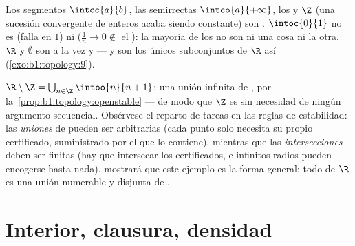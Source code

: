 \begin{example}\label{ex:b1:topology:closed}
Los segmentos $\intcc{a}{b}$, las semirrectas $\intco{a}{+\infty}$,
los  y $\Z$ (una sucesión convergente de enteros
acaba siendo constante) son . $\intoc{0}{1}$ no es 
(falla en $1$) ni  ($\frac 1n \to 0 \notin$ el ): la
mayoría de los  no son ni una cosa ni la otra. $\R$ y
$\emptyset$ son a la vez  y  --- y son los únicos
subconjuntos de $\R$ así (\cref{exo:b1:topology:9}).
\end{example}

\begin{example}\label{ex:b1:topology:rminusz}
$\R \setminus \Z = \bigcup_{n \in \Z} \intoo{n}{n+1}$: una unión
infinita de  ,  por
la~\cref{prop:b1:topology:openstable} --- de modo que $\Z$ es
 sin necesidad de ningún argumento secuencial. Obsérvese el
reparto de tareas en las reglas de estabilidad: las \emph{uniones} de
 pueden ser arbitrarias (cada punto solo necesita su propio
certificado, suministrado por el  que lo contiene), mientras
que las \emph{intersecciones} deben ser finitas (hay que intersecar
los certificados, e infinitos radios pueden encogerse hasta nada).
 mostrará que este ejemplo es la forma
general: todo  de $\R$ es una unión numerable y disjunta de
 .
\end{example}

\section{Interior, clausura, densidad}

